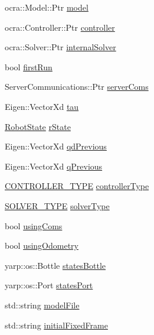 \begin{DoxyCompactItemize}
\item 
ocra\+::\+Model\+::\+Ptr \hyperlink{classocra__recipes_1_1ControllerServer_ab239e92da81b48afa2211ef9b25672f3}{model}
\item 
ocra\+::\+Controller\+::\+Ptr \hyperlink{classocra__recipes_1_1ControllerServer_a8e452bd0a8dce47b6fd289599e7ce210}{controller}
\item 
ocra\+::\+Solver\+::\+Ptr \hyperlink{classocra__recipes_1_1ControllerServer_a46e53b5a5bf9f7d55af477f85cb21522}{internal\+Solver}
\item 
bool \hyperlink{classocra__recipes_1_1ControllerServer_ad9aab75f01cb12f579ed441526b09ecf}{first\+Run}
\item 
Server\+Communications\+::\+Ptr \hyperlink{classocra__recipes_1_1ControllerServer_af01dc7be410bfebebefedc5f4bb27d1b}{server\+Coms}
\item 
Eigen\+::\+Vector\+Xd \hyperlink{classocra__recipes_1_1ControllerServer_a07e10b62b84a999c14843662a378ec0f}{tau}
\item 
\hyperlink{classocra__recipes_1_1RobotState}{Robot\+State} \hyperlink{classocra__recipes_1_1ControllerServer_a5c565a9ec45e5fad7b56e9a48609ef3d}{r\+State}
\item 
Eigen\+::\+Vector\+Xd \hyperlink{classocra__recipes_1_1ControllerServer_a0c8aeaa64fd882b0365731d61c68c931}{qd\+Previous}
\item 
Eigen\+::\+Vector\+Xd \hyperlink{classocra__recipes_1_1ControllerServer_aaba8c18a9f9e98ad54486012ef476ad1}{q\+Previous}
\item 
\hyperlink{namespaceocra__recipes_ae561cff4ea9a191b8b1ebb4e69a1a4ba}{C\+O\+N\+T\+R\+O\+L\+L\+E\+R\+\_\+\+T\+Y\+PE} \hyperlink{classocra__recipes_1_1ControllerServer_aaf53114a96960a3cb81577378c179411}{controller\+Type}
\item 
\hyperlink{namespaceocra__recipes_afb3bb4de56c2b9472c80d746eb13fed3}{S\+O\+L\+V\+E\+R\+\_\+\+T\+Y\+PE} \hyperlink{classocra__recipes_1_1ControllerServer_a7c7d1eda2c96085709f0c3a28fd998a4}{solver\+Type}
\item 
bool \hyperlink{classocra__recipes_1_1ControllerServer_a7f7559e938ca0e3cfff4833d86ef5b54}{using\+Coms}
\item 
bool \hyperlink{classocra__recipes_1_1ControllerServer_afd126a8b289e29213468fe9e9a800dd2}{using\+Odometry}
\item 
yarp\+::os\+::\+Bottle \hyperlink{classocra__recipes_1_1ControllerServer_a587f8ef2bc028bf845b1713955def5a1}{states\+Bottle}
\item 
yarp\+::os\+::\+Port \hyperlink{classocra__recipes_1_1ControllerServer_a1d314027131262206280be3e728bf59f}{states\+Port}
\item 
std\+::string \hyperlink{classocra__recipes_1_1ControllerServer_ab077706b924eed4ac5c50e9ade36acf4}{model\+File}
\item 
std\+::string \hyperlink{classocra__recipes_1_1ControllerServer_a93ffe0eff924223989db0ae6fcafaca2}{initial\+Fixed\+Frame}
\end{DoxyCompactItemize}


